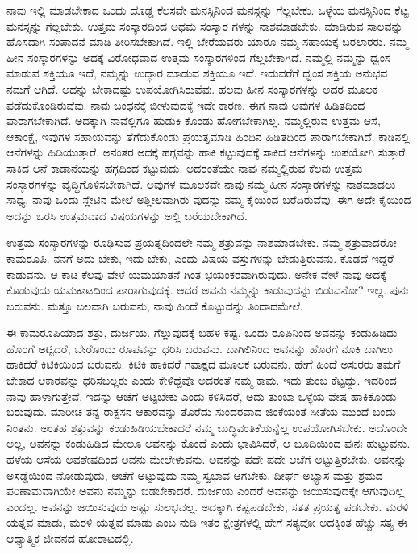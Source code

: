 ನಾವು ಇಲ್ಲಿ ಮಾಡಬೇಕಾದ ಒಂದು ದೊಡ್ಡ ಕೆಲಸವೇ ಮನಸ್ಸಿನಿಂದ ಮನಸ್ಸನ್ನು ಗೆಲ್ಲಬೇಕು. ಒಳ್ಳೆಯ ಮನಸ್ಸಿನಿಂದ ಕೆಟ್ಟ ಮನಸ್ಸನ್ನು ಗೆಲ್ಲಬೇಕು. ಉತ್ತಮ ಸಂಸ್ಕಾರದಿಂದ ಅಧಮ ಸಂಸ್ಕಾರ ಗಳನ್ನು ನಾಶಮಾಡಬೇಕು. ಮಾಡಿರುವ ಸಾಲವನ್ನು ಹೊಸದಾಗಿ ಸಂಪಾದನೆ ಮಾಡಿ ತೀರಿಸಬೇಕಾಗಿದೆ. ಇಲ್ಲಿ ಬೇರೆಯವರು ಯಾರೂ ನಮ್ಮ ಸಹಾಯಕ್ಕೆ ಬರಲಾರರು. ನಮ್ಮ ಹೀನ ಸಂಸ್ಕಾರಗಳನ್ನು ಅದಕ್ಕೆ ವಿರೋಧವಾದ ಉತ್ತಮ ಸಂಸ್ಕಾರಗಳಿಂದ ಗೆಲ್ಲಬೇಕಾಗಿದೆ. ನಮ್ಮಲ್ಲಿ ನಮ್ಮನ್ನು ಧ್ವಂಸ ಮಾಡುವ ಶಕ್ತಿಯೂ ಇದೆ, ನಮ್ಮನ್ನು ಉದ್ಧಾರ ಮಾಡುವ ಶಕ್ತಿಯೂ ಇದೆ. ಇದುವರೆಗೆ ಧ್ವಂಸ ಶಕ್ತಿಯ ಅನುಭವ ನಮಗೆ ಆಗಿದೆ. ಅದನ್ನು ಬೇಕಾದಷ್ಟು ಉಪಯೋಗಿಸಿರುವೆವು. ಹಲವು ಹೀನ ಸಂಸ್ಕಾರಗಳನ್ನು ಅದರ ಮೂಲಕ ಪಡೆದುಕೊಂಡಿರುವೆವು. ನಾವು ಬಂಧನಕ್ಕೆ ಬೀಳುವುದಕ್ಕೆ ಇದೇ ಕಾರಣ. ಈಗ ನಾವು ಅವುಗಳ ಹಿಡಿತದಿಂದ ಪಾರಾಗಬೇಕಾಗಿದೆ. ಅದಕ್ಕಾಗಿ ನಾವೆಲ್ಲಿಗೂ ಹುಡುಕಿ ಕೊಂಡು ಹೋಗಬೇಕಾಗಿಲ್ಲ. ನಮ್ಮಲ್ಲಿರುವ ಉತ್ತಮ ಆಸೆ, ಆಕಾಂಕ್ಷೆ, ಇವುಗಳ ಸಹಾಯವನ್ನು ತೆಗೆದುಕೊಂಡು ಪ್ರಯತ್ನಮಾಡಿ ಹಿಂದಿನ ಹಿಡಿತದಿಂದ ಪಾರಾಗಬೇಕಾಗಿದೆ. ಕಾಡಿನಲ್ಲಿ ಆನೆಗಳನ್ನು ಹಿಡಿಯುತ್ತಾರೆ. ಅನಂತರ ಅದಕ್ಕೆ ಹಗ್ಗವನ್ನು ಹಾಕಿ ಕಟ್ಟುವುದಕ್ಕೆ ಸಾಕಿದ ಆನೆಗಳನ್ನು ಉಪಯೋಗಿ ಸುತ್ತಾರೆ. ಸಾಕಿದ ಆನೆ ಕಾಡಾನೆಯನ್ನು ಹಗ್ಗದಿಂದ ಕಟ್ಟುವುದು. ಅದರಂತೆಯೇ ನಾವು ನಮ್ಮಲ್ಲಿರುವ ಕೆಲವು ಉತ್ತಮ ಸಂಸ್ಕಾರಗಳನ್ನು ವೃದ್ಧಿಗೊಳಿಸಬೇಕಾಗಿದೆ. ಅವುಗಳ ಮೂಲಕವೇ ನಾವು ನಮ್ಮ ಹೀನ ಸಂಸ್ಕಾರಗಳನ್ನು ನಾಶಮಾಡಲು ಸಾಧ್ಯ. ನಾವು ಒಂದು ಸ್ಲೇಟಿನ ಮೇಲೆ ಅಶ್ಲೀಲವಾಗಿರು ವುದನ್ನು ನಮ್ಮ ಕೈಯಿಂದ ಬರೆದಿರುವೆವು. ಈಗ ಅದೇ ಕೈಯಿಂದ ಅದನ್ನು ಒರಸಿ ಉತ್ತಮವಾದ ವಿಷಯಗಳನ್ನು ಅಲ್ಲಿ ಬರೆಯಬೇಕಾಗಿದೆ.

ಉತ್ತಮ ಸಂಸ್ಕಾರಗಳನ್ನು ರೂಢಿಸುವ ಪ್ರಯತ್ನದಿಂದಲೇ ನಮ್ಮ ಶತ್ರುವನ್ನು ನಾಶಮಾಡಬೇಕು. ನಮ್ಮ ಶತ್ರುವಾದರೋ ಕಾಮರೂಪಿ. ನನಗೆ ಅದು ಬೇಕು, ಇದು ಬೇಕು, ಎಂದು ವಿಷಯ ವಸ್ತುಗಳನ್ನು ಬೇಡುತ್ತಿರುವನು. ಕೊಡದೆ ಇದ್ದರೆ ಕಾಡುವನು. ಆ ಕಾಟ ಕೆಲವು ವೇಳೆ ಯಮಯಾತನೆ ಗಿಂತ ಭಯಂಕರವಾಗಿರುವುದು. ಅನೇಕ ವೇಳೆ ನಾವು ಅದಕ್ಕೆ ಕೊಡುವುದು ಯಮಕಾಟದಿಂದ ಪಾರಾಗುವುದಕ್ಕೆ. ಆದರೆ ಅವನು ನಮ್ಮನ್ನು ಕಾಡುವುದನ್ನು ಬಿಡುವನೋ? ಇಲ್ಲ. ಪುನಃ ಬರುವನು. ಮತ್ತೂ ಬಲವಾಗಿ ಬರುವನು, ನಾವು ಹಿಂದೆ ಕೊಟ್ಟುದನ್ನು ತಿಂದಾದಮೇಲೆ.

ಈ ಕಾಮರೂಪಿಯಾದ ಶತ್ರು, ದುರ್ಜಯ. ಗೆಲ್ಲುವುದಕ್ಕೆ ಬಹಳ ಕಷ್ಟ. ಒಂದು ರೂಪಿನಿಂದ ಅವನನ್ನು ಕಂಡುಹಿಡಿದು ಹೊರಗೆ ಅಟ್ಟಿದರೆ, ಬೇರೊಂದು ರೂಪವನ್ನು ಧರಿಸಿ ಬರುವನು. ಬಾಗಿಲಿನಿಂದ ಅವನನ್ನು ಹೊರಗೆ ನೂಕಿ ಬಾಗಿಲು ಹಾಕಿದರೆ ಕಿಟಿಕಿಯಿಂದ ಬರುವನು. ಕಿಟಿಕಿ ಹಾಕಿದರೆ ಗವಾಕ್ಷದ ಮೂಲಕ ಬರುವನು. ಹೇಗೆ ಹಿಂದೆ ಅಸುರರು ತಮಗೆ ಬೇಕಾದ ಆಕಾರವನ್ನು ಧರಿಸಬಲ್ಲರು ಎಂದು ಕೇಳಿದ್ದೆವೊ ಅದರಂತೆ ನಮ್ಮ ಕಾಮ. ಇದು ತುಂಬ ಕೆಟ್ಟದ್ದು. ಇದರಿಂದ ನಾವು ಹಾಳಾಗುತ್ತೇವೆ. ಇದನ್ನು ಆಚೆಗೆ ಅಟ್ಟಬೇಕು ಎಂದು ಕಳಿಸಿದರೆ, ಅದು ತುಂಬಾ ಒಳ್ಳೆಯ ವೇಷ ಹಾಕಿಕೊಂಡು ಬರುವುದು. ಮಾರೀಚ ತನ್ನ ರಾಕ್ಷಸನ ಆಕಾರವನ್ನು ತೊರೆದು ಸುಂದರವಾದ ಜಿಂಕೆಯಂತೆ ಸೀತೆಯ ಮುಂದೆ ಬಂದು ನಿಂತನು. ಅಂತಹ ಶತ್ರುವನ್ನು ಕಂಡುಹಿಡಿಯಬೇಕಾದರೆ ನಮ್ಮ ಬುದ್ಧಿವಂತಿಕೆಯನ್ನೆಲ್ಲ ಉಪಯೋಗಿಸಬೇಕು. ಅದೊಂದೇ ಅಲ್ಲ, ಅವನನ್ನು ಕಂಡುಹಿಡಿದ ಮೇಲೂ ಅವನನ್ನು ಕೊಂದೆ ಎಂದು ಭಾವಿಸಿದರೆ, ಆ ಬೂದಿಯಿಂದ ಪುನಃ ಹುಟ್ಟುವನು. ಹಳೆಯ ಆಸೆಯ ಅವಶೇಷದಿಂದ ಅವನು ಮೇಲೇಳುವನು. ಅವನನ್ನು ಪದೇ ಪದೇ ಆಚೆಗೆ ಅಟ್ಟುತ್ತಿರಬೇಕು. ಅವನನ್ನು ಅಸಡ್ಡೆಯಿಂದ ನೋಡುವುದು, ಆಚೆಗೆ ಅಟ್ಟುವುದು ನಮ್ಮ ಸ್ವಭಾವ ಆಗಬೇಕು. ದೀರ್ಘ ಅಭ್ಯಾಸ ಮತ್ತು ಶ್ರಮದ ಪರಿಣಾಮವಾಗಿಯೇ ಅವನು ನಮ್ಮನ್ನು ಬಿಡಬೇಕಾದರೆ. ದುರ್ಜಯ ಎಂದರೆ ಅವನನ್ನು ಜಯಿಸುವುದಕ್ಕೇ ಆಗುವುದಿಲ್ಲ ಎಂದಲ್ಲ. ಅವನನ್ನು ಜಯಿಸುವುದು ಅಷ್ಟು ಸುಲಭವಲ್ಲ. ಅದಕ್ಕಾಗಿ ಕಷ್ಟಪಡಬೇಕು, ಸತತ ಪ್ರಯತ್ನ ಪಡಬೇಕು. ಮರಳಿ ಯತ್ನವ ಮಾಡು, ಮರಳಿ ಯತ್ನವ ಮಾಡು ಎಂಬ ನುಡಿ ಇತರ ಕ್ಷೇತ್ರಗಳಲ್ಲಿ ಹೇಗೆ ಸತ್ಯವೋ ಅದಕ್ಕಿಂತ ಹೆಚ್ಚು ಸತ್ಯ ಈ ಆಧ್ಯಾತ್ಮಿಕ ಜೀವನದ ಹೋರಾಟದಲ್ಲಿ.

